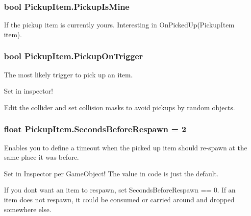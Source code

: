 \subsubsection[{\texorpdfstring{Pickup\+Is\+Mine}{PickupIsMine}}]{\setlength{\rightskip}{0pt plus 5cm}bool Pickup\+Item.\+Pickup\+Is\+Mine}\hypertarget{class_pickup_item_a5b7ca0ead3f54bdf3ae3fbb0d80607f3}{}\label{class_pickup_item_a5b7ca0ead3f54bdf3ae3fbb0d80607f3}


If the pickup item is currently yours. Interesting in On\+Picked\+Up(\+Pickup\+Item item).

\subsubsection[{\texorpdfstring{Pickup\+On\+Trigger}{PickupOnTrigger}}]{\setlength{\rightskip}{0pt plus 5cm}bool Pickup\+Item.\+Pickup\+On\+Trigger}\hypertarget{class_pickup_item_a6fb1c4a94bef1e321638b430e27141d1}{}\label{class_pickup_item_a6fb1c4a94bef1e321638b430e27141d1}


The most likely trigger to pick up an item. 

Set in inspector!

Edit the collider and set collision masks to avoid pickups by random objects.
\subsubsection[{\texorpdfstring{Seconds\+Before\+Respawn}{SecondsBeforeRespawn}}]{\setlength{\rightskip}{0pt plus 5cm}float Pickup\+Item.\+Seconds\+Before\+Respawn = 2}\hypertarget{class_pickup_item_a026d74417bd3cebea3076b676bee27b8}{}\label{class_pickup_item_a026d74417bd3cebea3076b676bee27b8}


Enables you to define a timeout when the picked up item should re-\/spawn at the same place it was before. 

Set in Inspector per Game\+Object! The value in code is just the default.

If you don\textquotesingle{}t want an item to respawn, set Seconds\+Before\+Respawn == 0. If an item does not respawn, it could be consumed or carried around and dropped somewhere else.


